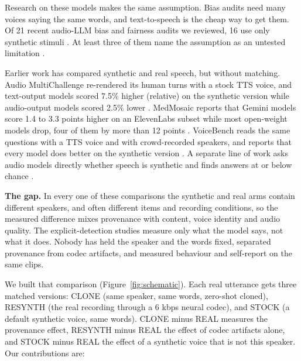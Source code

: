 Research on these models makes the same assumption. Bias audits need many voices saying the same words, and text-to-speech is the cheap way to get them. Of 21 recent audio-LLM bias and fairness audits we reviewed, 16 use only synthetic stimuli \citep{a2510_02352,a2602_01030,a2511_06592,a2603_16941}. At least three of them name the assumption as an untested limitation \citep{a2509_22061,a2604_14548,a2602_04796}.

Earlier work has compared synthetic and real speech, but without matching. Audio MultiChallenge re-rendered its human turns with a stock TTS voice, and text-output models scored 7.5\% higher (relative) on the synthetic version while audio-output models scored 2.5\% lower \citep{a2512_14865}. MedMosaic reports that Gemini models score 1.4 to 3.3 points higher on an ElevenLabs subset while most open-weight models drop, four of them by more than 12 points \citep{a2605_00969}. VoiceBench reads the same questions with a TTS voice and with crowd-recorded speakers, and reports that every model does better on the synthetic version \citep{a2410_17196}. A separate line of work asks audio models directly whether speech is synthetic and finds answers at or below chance \citep{a2505_11079,a2512_10652}.

\textbf{The gap.} In every one of these comparisons the synthetic and real arms contain different speakers, and often different items and recording conditions, so the measured difference mixes provenance with content, voice identity and audio quality. The explicit-detection studies measure only what the model says, not what it does. Nobody has held the speaker and the words fixed, separated provenance from codec artifacts, and measured behaviour and self-report on the same clips.

We built that comparison (Figure~\ref{fig:schematic}). Each real utterance gets three matched versions: CLONE (same speaker, same words, zero-shot cloned), RESYNTH (the real recording through a 6 kbps neural codec), and STOCK (a default synthetic voice, same words). CLONE minus REAL measures the provenance effect, RESYNTH minus REAL the effect of codec artifacts alone, and STOCK minus REAL the effect of a synthetic voice that is not this speaker. Our contributions are:

